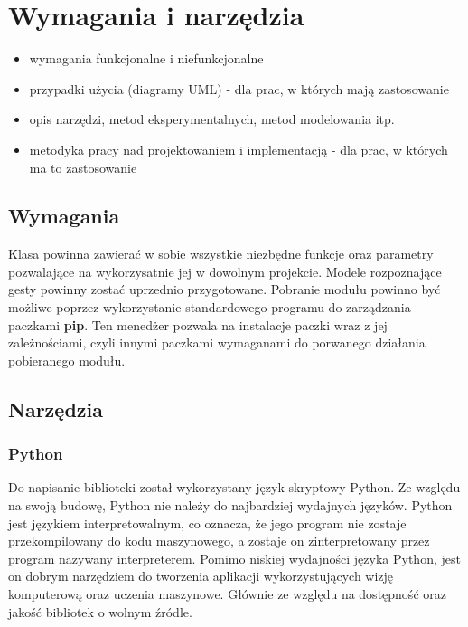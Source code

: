 
\chapter{Wymagania i narzędzia}

\begin{itemize}
\item wymagania funkcjonalne i niefunkcjonalne
\item przypadki użycia (diagramy UML) - dla prac, w których mają zastosowanie
\item opis narzędzi, metod eksperymentalnych, metod modelowania itp.
\item metodyka pracy nad projektowaniem i implementacją - dla prac, w których ma to zastosowanie
\end{itemize}


\section{Wymagania}

\quad Klasa powinna zawierać w sobie wszystkie niezbędne funkcje oraz parametry pozwalające na wykorzysatnie jej w dowolnym projekcie. Modele rozpoznające gesty powinny zostać uprzednio przygotowane. 
\quad Pobranie modułu powinno być możliwe poprzez wykorzystanie standardowego programu do zarządzania paczkami \textbf{pip}. Ten menedżer pozwala na instalacje paczki wraz z jej zależnościami, czyli innymi paczkami wymaganami do porwanego działania pobieranego modułu. 

\section{Narzędzia}

\subsection{Python}
\quad Do napisanie biblioteki został wykorzystany język skryptowy Python. Ze względu na swoją budowę, Python nie należy do najbardziej wydajnych języków. Python jest językiem interpretowalnym, co oznacza, że jego program nie zostaje przekompilowany do kodu maszynowego, a zostaje on zinterpretowany przez program nazywany interpreterem. 
\quad Pomimo niskiej wydajności języka Python, jest on dobrym narzędziem do tworzenia aplikacji wykorzystujących wizję komputerową oraz uczenia maszynowe. Głównie ze względu na dostępność oraz jakość bibliotek o wolnym źródle.  


